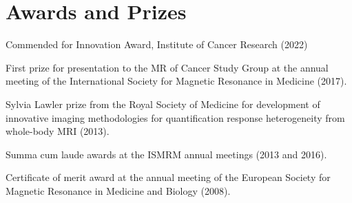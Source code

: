 \documentclass[]{mbcv}
\begin{document}
\section{Awards and Prizes}
\vspace*{10pt}
\begin{tightemize}
\item Commended for Innovation Award, Institute of Cancer Research (2022)
\item First prize for presentation to the MR of Cancer Study Group at the annual meeting of the International Society for Magnetic Resonance in Medicine (2017). 
\item Sylvia Lawler prize from the Royal Society of Medicine for development of innovative imaging methodologies for quantification response heterogeneity from whole-body MRI (2013).
\item Summa cum laude awards at the ISMRM annual meetings (2013 and 2016).
\item Certificate of merit award at the annual meeting of the European Society for Magnetic Resonance in Medicine and Biology (2008).
\end{tightemize}

\newpage
\end{document}
